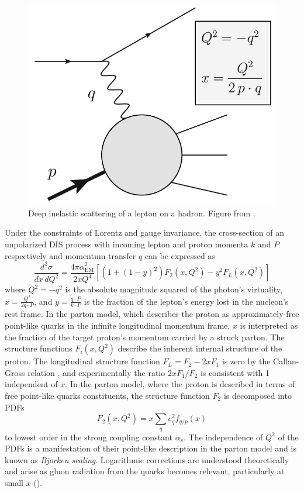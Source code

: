 \begin{figure}[t]
  \includegraphics{dis_electron_proton.png}
  \caption{Deep inelastic scattering of a lepton on a hadron. Figure from .
}
  \label{fig:dis}
\end{figure}

Under the constraints of Lorentz and gauge invariance, the cross-section of an unpolarized \ac{DIS} process with incoming lepton and proton momenta $k$ and $P$ respectively and momentum transfer $q$ can be expressed as \cite{Tanabashi:2018oca}
\begin{equation}
  \frac{d^2 \sigma}{dx \, dQ^2} = \frac{4\pi\alpha^2_\textrm{EM}}{2xQ^4}\left[ \left(1+(1-y)^2\right) F_2\left(x, Q^2\right) - y^2 F_L \left(x, Q^2\right) \right]
  \label{eq:dis}
\end{equation}
where $Q^2 = -q^2$ is the absolute magnitude squared of the photon's virtuality, $x = \frac{Q^2}{2q \cdot P}$, and $y = \frac{q \cdot P}{k \cdot P}$ is the fraction of the lepton's energy lost in the nucleon's rest frame.
In the parton model, which describes the proton as approximately-free point-like quarks in the infinite longitudinal momentum frame, $x$ is interpreted as the fraction of the target proton's momentum carried by a struck parton.
The structure functions $F_i(x, Q^2)$ describe the inherent internal structure of the proton.
The longitudinal structure function $F_L = F_2 - 2xF_1$ is zero by the Callan-Gross relation \cite{Callan:1969uq}, and experimentally the ratio $2xF_1 / F_2$ is consistent with 1 independent of $x$.
In the parton model, where the proton is described in terms of free point-like quarks constituents, the structure function $F_2$ is decomposed into \acp{PDF}
\begin{equation}
F_2 \left(x, Q^2\right) = x \sum_q e_q^2 f_{q/p}(x)
\end{equation}
to lowest order in the strong coupling constant $\alpha_s$.
The independence of $Q^2$ of the \acp{PDF} is a manifestation of their point-like description in the parton model and is known as \emph{Bjorken scaling}.
Logarithmic corrections are understood theoretically and arise as gluon radiation from the quarks becomes relevant, particularly at small $x$ ().

